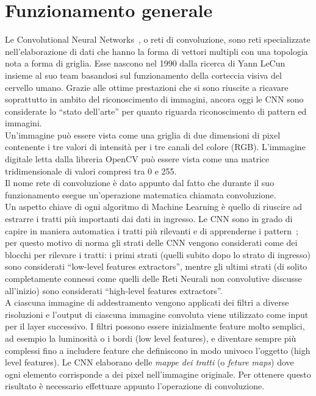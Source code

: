 \section{Funzionamento generale}
Le Convolutional Neural Networks~\cite{reti}, o reti di convoluzione, sono reti specializzate 
nell'elaborazione di dati che hanno la forma di vettori multipli con una topologia 
nota a forma di griglia. Esse nascono nel 1990 dalla ricerca di Yann LeCun 
insieme al suo team basandosi sul funzionamento della corteccia visiva del
 cervello umano. Grazie alle ottime prestazioni che si sono riuscite a ricavare 
 soprattutto in ambito del riconoscimento di immagini, ancora oggi le
CNN sono considerate lo “stato dell’arte” per quanto riguarda riconoscimento di
 pattern ed immagini.  \\
Un’immagine può essere vista come una griglia di due dimensioni di pixel 
contenente i tre valori di intensità per i tre canali del colore (RGB). L'immagine digitale letta dalla libreria OpenCV può essere vista come una matrice tridimensionale di valori compresi tra 0 e 255.\\
Il nome rete di convoluzione è dato appunto dal fatto che durante il suo 
funzionamento esegue un’operazione matematica chiamata convoluzione. \\
Un aspetto chiave di ogni algoritmo di Machine Learning è quello di riuscire
 ad estrarre i tratti più importanti dai dati in ingresso. Le CNN sono 
 in grado di capire in maniera automatica i tratti più rilevanti e di apprenderne 
 i pattern~\cite{cnn}; per questo motivo di norma gli strati delle CNN vengono considerati 
 come dei blocchi per rilevare i tratti: i primi strati (quelli subito dopo lo
  strato di ingresso) sono considerati “low-level features extractors”, mentre
   gli ultimi strati (di solito completamente connessi come quelli delle Reti 
   Neurali non convolutive discusse all’inizio) sono considerati 
   “high-level features extractors”. \\
   A ciascuna immagine di addestramento vengono applicati dei filtri 
   a diverse risoluzioni e l’output di ciascuna immagine convoluta viene utilizzato 
   come input per il layer successivo. I filtri possono essere inizialmente feature 
   molto semplici, ad esempio la luminosità o i bordi (low level features), e diventare sempre più
    complessi fino a includere feature che definiscono in modo univoco l’oggetto (high level features).
   Le CNN elaborano delle \emph{mappe dei tratti} (o \emph{feture maps}) dove ogni elemento corrisponde
    a dei pixel nell’immagine originale. Per ottenere questo risultato è necessario
     effettuare appunto l’operazione di convoluzione.\\
    
